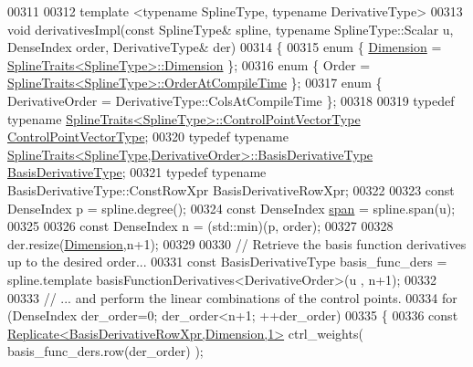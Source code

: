 \begin{DoxyCode}
00311 
00312   \textcolor{keyword}{template} <\textcolor{keyword}{typename} SplineType, \textcolor{keyword}{typename} DerivativeType>
00313   \textcolor{keywordtype}{void} derivativesImpl(\textcolor{keyword}{const} SplineType& spline, \textcolor{keyword}{typename} SplineType::Scalar u, DenseIndex order, 
      DerivativeType& der)
00314   \{    
00315     \textcolor{keyword}{enum} \{ \hyperlink{group___splines___module_a82c233f1d4719bc52397d64a6c96c5b0a25366e5e79da5355d259a71096d8d8a7}{Dimension} = \hyperlink{struct_eigen_1_1_spline_traits}{SplineTraits<SplineType>::Dimension} \};
00316     \textcolor{keyword}{enum} \{ Order = \hyperlink{struct_eigen_1_1_spline_traits}{SplineTraits<SplineType>::OrderAtCompileTime}
       \};
00317     \textcolor{keyword}{enum} \{ DerivativeOrder = DerivativeType::ColsAtCompileTime \};
00318 
00319     \textcolor{keyword}{typedef} \textcolor{keyword}{typename} \hyperlink{struct_eigen_1_1_spline_traits}{SplineTraits<SplineType>::ControlPointVectorType}
       \hyperlink{group___splines___module_ac42c673462a98ad1779761bebeb450bf}{ControlPointVectorType};
00320     \textcolor{keyword}{typedef} \textcolor{keyword}{typename} 
      \hyperlink{struct_eigen_1_1_spline_traits}{SplineTraits<SplineType,DerivativeOrder>::BasisDerivativeType}
       \hyperlink{group___splines___module_a9db0b0108353660cd03524f2e67d6b3c}{BasisDerivativeType};
00321     \textcolor{keyword}{typedef} \textcolor{keyword}{typename} BasisDerivativeType::ConstRowXpr BasisDerivativeRowXpr;    
00322 
00323     \textcolor{keyword}{const} DenseIndex p = spline.degree();
00324     \textcolor{keyword}{const} DenseIndex \hyperlink{group___splines___module_ab62751802b4cc237aadb0dbf3455df98}{span} = spline.span(u);
00325 
00326     \textcolor{keyword}{const} DenseIndex n = (std::min)(p, order);
00327 
00328     der.resize(\hyperlink{group___splines___module_a82c233f1d4719bc52397d64a6c96c5b0a25366e5e79da5355d259a71096d8d8a7}{Dimension},n+1);
00329 
00330     \textcolor{comment}{// Retrieve the basis function derivatives up to the desired order...    }
00331     \textcolor{keyword}{const} BasisDerivativeType basis\_func\_ders = spline.template basisFunctionDerivatives<DerivativeOrder>(u
      , n+1);
00332 
00333     \textcolor{comment}{// ... and perform the linear combinations of the control points.}
00334     \textcolor{keywordflow}{for} (DenseIndex der\_order=0; der\_order<n+1; ++der\_order)
00335     \{
00336       \textcolor{keyword}{const} \hyperlink{group___core___module_class_eigen_1_1_replicate}{Replicate<BasisDerivativeRowXpr,Dimension,1>} 
      ctrl\_weights( basis\_func\_ders.row(der\_order) );

\end{DoxyCode}
